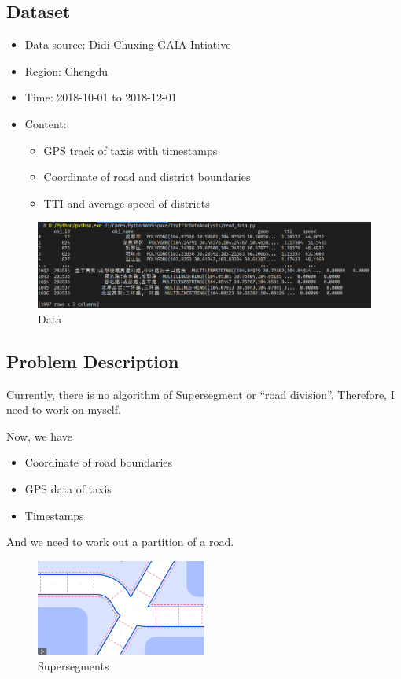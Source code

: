 \documentclass[fontset=none]{ctexart}
\theoremstyle{definition}
\theoremstyle{remark}
\begin{document}
\subsection{Dataset}
\begin{itemize}
    \item Data source: Didi Chuxing GAIA Intiative
    \item Region: Chengdu
    \item Time: 2018-10-01 to 2018-12-01
    \item Content:
        \begin{itemize}
            \item GPS track of taxis with timestamps
            \item Coordinate of road and district boundaries
            \item TTI and average speed of districts
        \end{itemize}
\end{itemize}
\begin{figure}[htb]
  \centering
  \includegraphics[width=\textwidth]{images/dataset.png}
  \caption{Data}
  \label{fig: dataset}
\end{figure}

\subsection{Problem Description}
Currently, there is no algorithm of Supersegment or ``road division''. 
Therefore, I need to work on myself.

Now, we have
\begin{itemize}
    \item Coordinate of road boundaries
    \item GPS data of taxis
    \item Timestamps
\end{itemize}
And we need to work out a partition of a road.
\begin{figure}[htb]
    \centering
    \includegraphics[width=0.5\textwidth]{images/supersegment.png}
    \caption{Supersegments}
    \label{fig: supersegment}
\end{figure}
\end{document}
